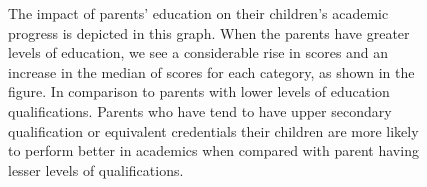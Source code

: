 \documentclass[
  11pt,
  a4paper,
]{article}
\begin{document}
\begin{figure}[H]


\caption{\label{fig-qualplot}The impact of parents' education on their
children's academic progress is depicted in this graph. When the parents
have greater levels of education, we see a considerable rise in scores
and an increase in the median of scores for each category, as shown in
the figure. In comparison to parents with lower levels of education
qualifications. Parents who have tend to have upper secondary
qualification or equivalent credentials their children are more likely
to perform better in academics when compared with parent having lesser
levels of qualifications.}

\end{figure}%
\end{document}
